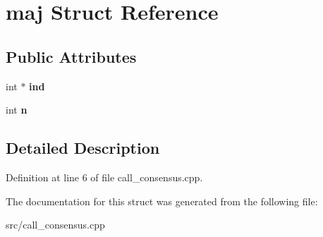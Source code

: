 \hypertarget{structmaj}{}\section{maj Struct Reference}
\label{structmaj}
\subsection*{Public Attributes}
\begin{DoxyCompactItemize}
\item 
\mbox{\label{structmaj_aa2673f706808abc37cd8e3a6270c6f61}} 
int $\ast$ {\bfseries ind}
\item 
\mbox{\label{structmaj_ae7de5964f5dc96404485739b68f434fe}} 
int {\bfseries n}
\end{DoxyCompactItemize}


\subsection{Detailed Description}


Definition at line 6 of file call\+\_\+consensus.\+cpp.



The documentation for this struct was generated from the following file\+:\begin{DoxyCompactItemize}
\item 
src/call\+\_\+consensus.\+cpp\end{DoxyCompactItemize}
